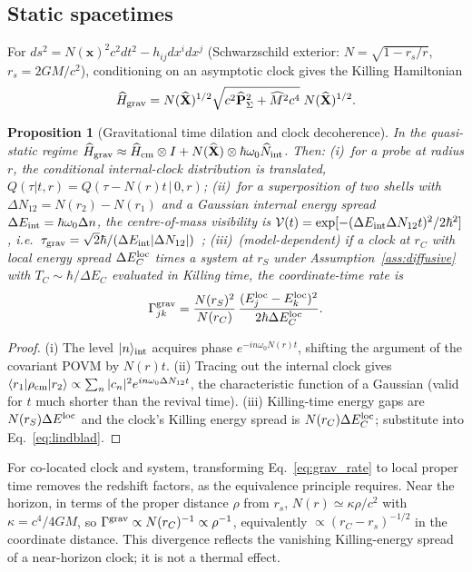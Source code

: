 \documentclass[aps,prd,onecolumn,notitlepage,10pt,amsmath,amssymb,amsfonts,nofootinbib]{revtex4-2}
\newtheorem{proposition}{Proposition}
\theoremstyle{definition}
\theoremstyle{remark}
\newcommand{\Nop}{\widehat{N}}
\begin{document}
\subsection{Static spacetimes}
\label{sec:curved}
For $ds^2=N(\mathbf x)^2c^2dt^2-h_{ij}dx^idx^j$ (Schwarzschild exterior: $N=\sqrt{1-r_s/r}$, $r_s=2GM/c^2$), conditioning on an asymptotic clock gives the Killing Hamiltonian
\begin{equation}
  \widehat H_{\rm grav}=N(\widehat{\mathbf X})^{1/2}\sqrt{c^2\widehat{\mathbf P}_\Sigma^2+\widehat M^2c^4}\;N(\widehat{\mathbf X})^{1/2}.
  \label{eq:hgrav}
\end{equation}
\begin{proposition}[Gravitational time dilation and clock decoherence]
\label{prop:grav}
In the quasi-static regime $\widehat H_{\rm grav}\approx\widehat H_{\rm cm}\otimes I+N(\widehat{\mathbf X})\otimes\hbar\omega_0\Nop_{\rm int}$. Then:
(i)~for a probe at radius $r$, the conditional internal-clock distribution is translated, $Q(\tau|t,r)=Q(\tau-N(r)t\,|\,0,r)$;
(ii)~for a superposition of two shells with $\Delta N_{12}=N(r_2)-N(r_1)$ and a Gaussian internal energy spread $\Delta E_{\rm int}=\hbar\omega_0\Delta n$, the centre-of-mass visibility is $\mathcal V(t)=\exp[-(\Delta E_{\rm int}\Delta N_{12}t)^2/2\hbar^2]$, i.e.\ $\tau_{\rm grav}=\sqrt2\hbar/(\Delta E_{\rm int}|\Delta N_{12}|)$~\cite{Zych2011,Pikovski2015};
(iii)~\emph{(model-dependent)} if a clock at $r_C$ with local energy spread $\Delta E_C^{\rm loc}$ times a system at $r_S$ under Assumption~\ref{ass:diffusive} with $T_C\sim\hbar/\Delta E_C$ evaluated in Killing time, the coordinate-time rate is
\begin{equation}
  \Gamma_{jk}^{\rm grav}=\frac{N(r_S)^2}{N(r_C)}\,\frac{(E_j^{\rm loc}-E_k^{\rm loc})^2}{2\hbar\Delta E_C^{\rm loc}} .
  \label{eq:grav_rate}
\end{equation}
\end{proposition}
\begin{proof}
(i) The level $|n\rangle_{\rm int}$ acquires phase $e^{-in\omega_0N(r)t}$, shifting the argument of the covariant POVM by $N(r)t$. (ii) Tracing out the internal clock gives $\langle r_1|\rho_{\rm cm}|r_2\rangle\propto\sum_n|c_n|^2e^{in\omega_0\Delta N_{12}t}$, the characteristic function of a Gaussian (valid for $t$ much shorter than the revival time). (iii) Killing-time energy gaps are $N(r_S)\Delta E^{\rm loc}$ and the clock's Killing energy spread is $N(r_C)\Delta E_C^{\rm loc}$; substitute into Eq.~\eqref{eq:lindblad}.
\end{proof}
For co-located clock and system, transforming Eq.~\eqref{eq:grav_rate} to local proper time removes the redshift factors, as the equivalence principle requires. Near the horizon, in terms of the proper distance $\rho$ from $r_s$, $N(r)\simeq\kappa\rho/c^2$ with $\kappa=c^4/4GM$, so $\Gamma^{\rm grav}\propto N(r_C)^{-1}\propto\rho^{-1}$, equivalently $\propto(r_C-r_s)^{-1/2}$ in the coordinate distance. This divergence reflects the vanishing Killing-energy spread of a near-horizon clock; it is not a thermal effect.
\end{document}
